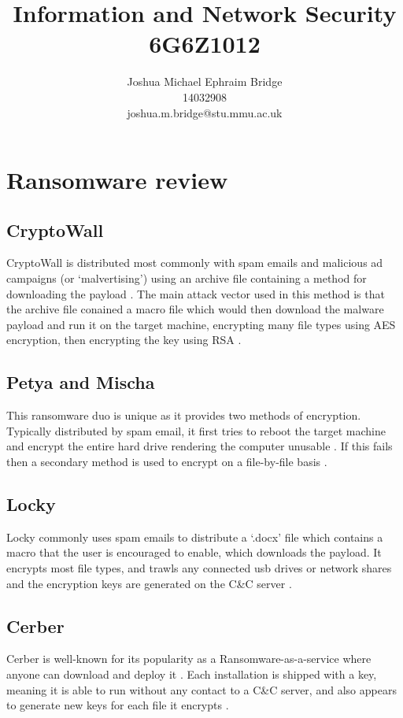 \documentclass[12pt]{article}
\title{\vspace{2cm}\textbf{Information and Network Security}\\6G6Z1012}
\author{Joshua Michael Ephraim Bridge\\14032908\\joshua.m.bridge@stu.mmu.ac.uk}
\begin{document}
\maketitle

\tableofcontents

\newpage

\section{Ransomware review}
  \subsection{CryptoWall}
    CryptoWall is distributed most commonly with spam emails and malicious ad campaigns (or ‘malvertising’) using an archive file containing a method for downloading the payload \citep{symantec2016cryptowall}. The main attack vector used in this method is that the archive file conained a macro file which would then download the malware payload and run it on the target machine, encrypting many file types using AES encryption, then encrypting the key using RSA \citep{sophos2015cryptowall}.

  \subsection{Petya and Mischa}
    This ransomware duo is unique as it provides two methods of encryption. Typically distributed by spam email, it first tries to reboot the target machine and encrypt the entire hard drive rendering the computer unusable \citep{malwarebytes2016petya}. If this fails then a secondary method is used to encrypt on a file-by-file basis \citep{avast2016petya}.

  \subsection{Locky}
    Locky commonly uses spam emails to distribute a ‘.docx’ file which contains a macro that the user is encouraged to enable, which downloads the payload. It encrypts most file types, and trawls any connected usb drives or network shares \citep{ducklin2016locky} and the encryption keys are generated on the C\&C server \citep{avast2017locky}.

  \subsection{Cerber}
    Cerber is well-known for its popularity as a Ransomware-as-a-service where anyone can download and deploy it \citep{barkly2017cerber}. Each installation is shipped with a key, meaning it is able to run without any contact to a C\&C server, and also appears to generate new keys for each file it encrypts \citep{malwarebytes2016cerber}.
\end{document}
